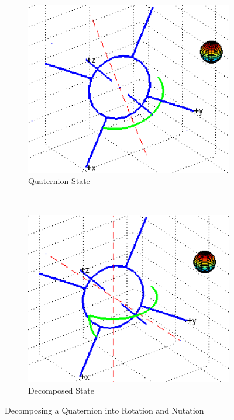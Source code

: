 \begin{figure}[H]
  \begin{subfigure}[h!]{0.5\textwidth}
    \includegraphics[width=\textwidth]{figures/quaternion_decompose_pre.eps}
    \caption{Quaternion State}
    \label{fig:PreDecomposedQuaternion}
  \end{subfigure}
  ~
  \begin{subfigure}[h!]{0.5\textwidth}
    \includegraphics[width=\textwidth]{figures/quaternion_decompose_post.eps}
    \caption{Decomposed State}
    \label{fig:PostDecomposedQuaternion}
  \end{subfigure}
  \caption{Decomposing a Quaternion into Rotation and Nutation}
  \label{fig:QuaternionDecomposition}
\end{figure}

